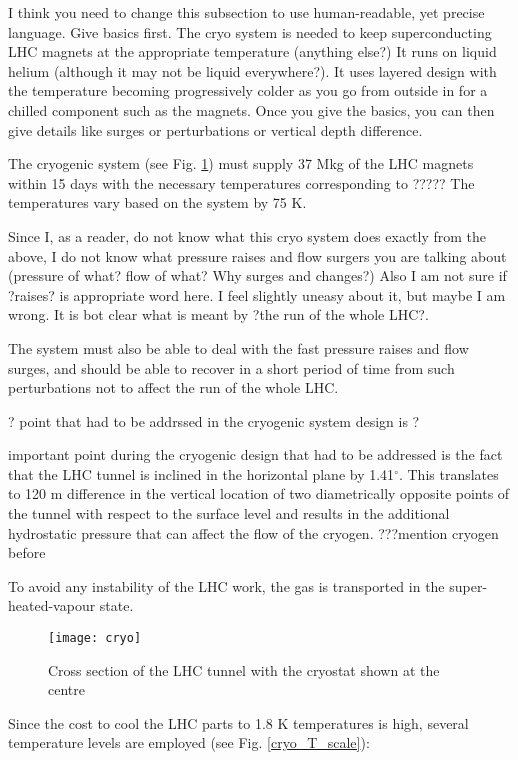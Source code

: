 I think you need to change this subsection to use human-readable, yet precise language. Give basics first. The cryo system is needed to keep superconducting LHC magnets at the appropriate temperature (anything else?) It runs on liquid helium (although it may not be liquid everywhere?). It uses layered design with the temperature becoming progressively colder as you go from outside in for a chilled component such as the magnets. Once you give the basics, you can then give details like surges or perturbations or vertical depth difference.


The cryogenic system (see Fig. \ref{cryo}) must supply 37 Mkg of the LHC magnets within 15 days with the necessary temperatures corresponding to ????? The temperatures vary based on the system by 75 K. 

Since I, as a reader, do not know what this cryo system does exactly from the above, I do not know what pressure
raises and flow surgers you are talking about (pressure of what? flow of what? Why surges and changes?)
  Also I am not sure if ?raises? is appropriate word here. I feel slightly uneasy about it, but maybe I am wrong.
  It is bot clear what is meant by ?the run of the whole LHC?. 
  
  
The system must also be able to deal with the fast pressure raises and flow surges, and should be able to recover in a short period of time from such perturbations not to affect the run of the whole LHC. 

? point that had to be addrssed in the cryogenic system design is ?

 important point during the cryogenic design that had to be addressed is the fact that the LHC tunnel is inclined in the horizontal plane by 1.41$^\circ$. This translates to 120 m difference in the vertical location of two diametrically opposite points of the tunnel with respect to the surface level and results in the additional hydrostatic pressure that can affect the flow of the cryogen. ???mention cryogen before
 
 
 To avoid any instability of the LHC work, the gas is transported in the super-heated-vapour state. 

\begin{figure}[H]
  \centering
  \texttt{[image: cryo]}
  \caption{Cross section of the LHC tunnel with the cryostat shown at the centre}\label{cryo}
\end{figure}


Since the cost to cool the LHC parts to 1.8 K temperatures is high, several temperature levels are employed (see Fig. \ref{cryo_T_scale}):
 
